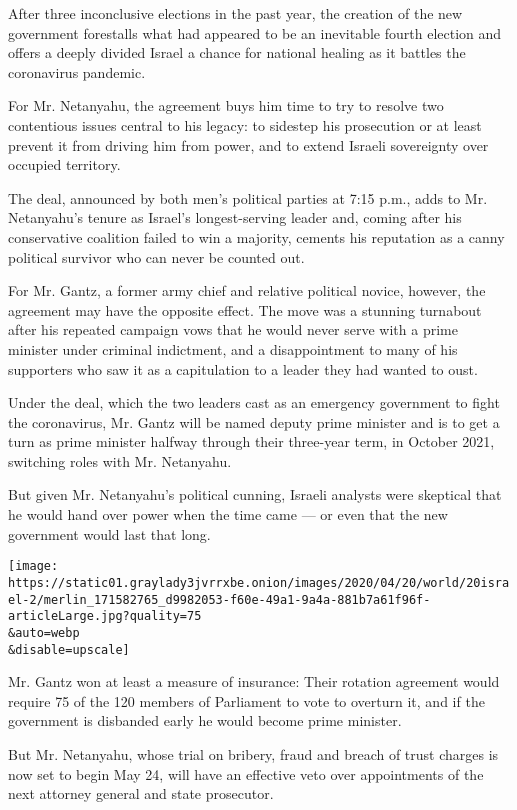 After three inconclusive elections in the past year, the creation of the
new government forestalls what had appeared to be an inevitable fourth
election and offers a deeply divided Israel a chance for national
healing as it battles the coronavirus pandemic.

For Mr. Netanyahu, the agreement buys him time to try to resolve two
contentious issues central to his legacy: to sidestep his prosecution or
at least prevent it from driving him from power, and to extend Israeli
sovereignty over occupied territory.

The deal, announced by both men's political parties at 7:15 p.m., adds
to Mr. Netanyahu's tenure as Israel's longest-serving leader and, coming
after his conservative coalition failed to win a majority, cements his
reputation as a canny political survivor who can never be counted out.

For Mr. Gantz, a former army chief and relative political novice,
however, the agreement may have the opposite effect. The move was a
stunning turnabout after his repeated campaign vows that he would never
serve with a prime minister under criminal indictment, and a
disappointment to many of his supporters who saw it as a capitulation to
a leader they had wanted to oust.

Under the deal, which the two leaders cast as an emergency government to
fight the coronavirus, Mr. Gantz will be named deputy prime minister and
is to get a turn as prime minister halfway through their three-year
term, in October 2021, switching roles with Mr. Netanyahu.

But given Mr. Netanyahu's political cunning, Israeli analysts were
skeptical that he would hand over power when the time came --- or even
that the new government would last that long.

\texttt{[image: https://static01.graylady3jvrrxbe.onion/images/2020/04/20/world/20israel-2/merlin\_171582765\_d9982053-f60e-49a1-9a4a-881b7a61f96f-articleLarge.jpg?quality=75\\\&auto=webp\\\&disable=upscale]}

Mr. Gantz won at least a measure of insurance: Their rotation agreement
would require 75 of the 120 members of Parliament to vote to overturn
it, and if the government is disbanded early he would become prime
minister.

But Mr. Netanyahu, whose trial on bribery, fraud and breach of trust
charges is now set to begin May 24, will have an effective veto over
appointments of the next attorney general and state prosecutor.

